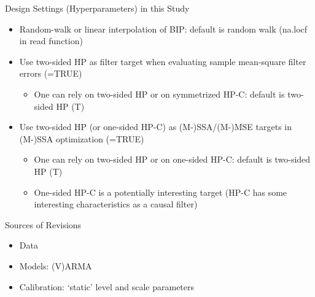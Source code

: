 \documentclass{beamer}
\begin{document}
\begin{frame} {Design Settings (Hyperparameters) in this Study}
\begin{itemize}
\item Random-walk or linear interpolation of BIP: default is random walk (na.locf in read function)
\item Use two-sided HP as filter target when evaluating sample mean-square filter errors (=TRUE)
\begin{itemize}
\item One can rely on two-sided HP or on symmetrized HP-C: default is two-sided HP (T)
\end{itemize}
\item Use two-sided HP (or one-sided HP-C) as (M-)SSA/(M-)MSE targets in (M-)SSA optimization (=TRUE)
\begin{itemize}
\item One can rely on two-sided HP or on one-sided HP-C: default is two-sided HP (T)
\item One-sided HP-C is a potentially interesting target (HP-C has some interesting characteristics as a causal filter)
\end{itemize}
\end{itemize}
\end{frame}




\begin{frame} {Sources of Revisions}
\begin{itemize}
\item Data
\item Models: (V)ARMA
\item Calibration: `static' level and scale parameters
\end{itemize}
\end{frame}
\end{document}
